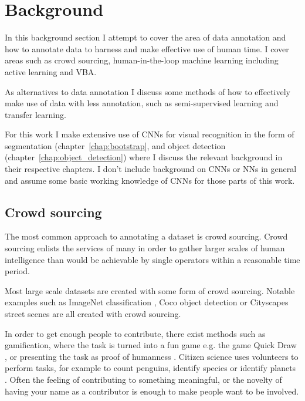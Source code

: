 \section {Background}

In this background section I attempt to cover the area of data annotation and how to annotate data to harness and make effective use of human time. I cover areas such as crowd sourcing, human-in-the-loop machine learning including active learning and \gls{VBA}.

As alternatives to data annotation I discuss some methods of how to effectively make use of data with less annotation, such as semi-supervised learning and transfer learning. 

For this work I make extensive use of \gls{CNN}s for visual recognition in the form of segmentation (chapter~\ref{chap:bootstrap}, and object detection (chapter~\ref{chap:object_detection}) where I discuss the relevant background in their respective chapters. I don't include background on \gls{CNN}s or \gls{NN}s in general and assume some basic working knowledge of \gls{CNN}s for those parts of this work.


\subsection {Crowd sourcing}

The most common approach to annotating a dataset is crowd sourcing. Crowd sourcing enlists the services of many in order to gather larger scales of human intelligence than would be achievable by single operators within a reasonable time period.

Most large scale datasets are created with some form of crowd sourcing. Notable examples such as ImageNet classification \cite{JiaDeng2009}, Coco object detection \cite{Lin2014} or Cityscapes street scenes \cite{Cordts2016} are all created with crowd sourcing. 

In order to get enough people to contribute, there exist methods such as gamification, where the task is turned into a fun game  e.g. the game Quick Draw \cite{Ha2017}, or presenting the task as proof of humanness \cite{Goodfellow2013a}. Citizen science uses volunteers to perform tasks, for example to count penguins, identify species or identify planets \cite{Simpson2014, Masters2016}. Often the feeling of contributing to something meaningful, or the novelty of having your name as a contributor is enough to make people want to be involved.

